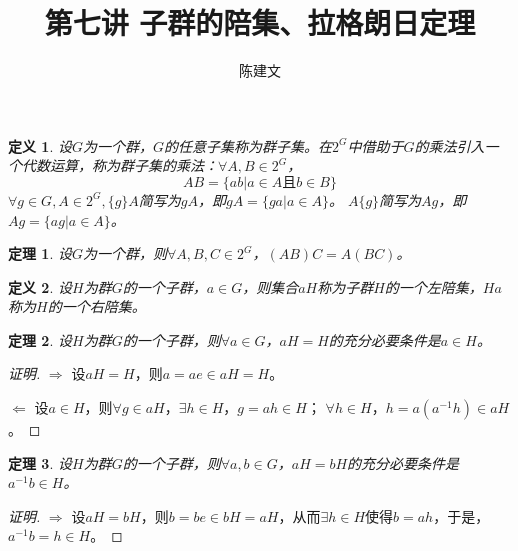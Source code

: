 \documentclass{article}
\newtheorem{Def}{定义}
\newtheorem{Thm}{定理}
\begin{document}
\begin{CJK*}{UTF8}{gbsn}
  \title{第七讲 子群的陪集、拉格朗日定理}
  \author{陈建文}
  \maketitle
  \begin{Def}
    设$G$为一个群，$G$的任意子集称为群子集。在$2^G$中借助于$G$的乘法引入一个代数运算，称为群子集的乘法：$\forall A,B\in 2^G$，
    \[AB=\{ab|a\in A \text{且} b\in B\}\]
    $\forall g\in G,A\in 2^G,\{g\}A$简写为$gA$，即$gA=\{ga|a\in A\}$。
    $A\{g\}$简写为$Ag$，即$Ag=\{ag|a\in A\}$。
  \end{Def}
  \begin{Thm}
    设$G$为一个群，则$\forall A,B,C\in 2^G$，$(AB)C=A(BC)$。
  \end{Thm}
\begin{Def}
  设$H$为群$G$的一个子群，$a\in G$，则集合$aH$称为子群$H$的一个左陪集，$Ha$称为$H$的一个右陪集。
\end{Def}

\begin{Thm}
  设$H$为群$G$的一个子群，则$\forall a\in G$，$aH=H$的充分必要条件是$a\in H$。
\end{Thm}
\begin{proof}[证明]
$\Rightarrow$
设$aH=H$，则$a=ae\in aH=H$。

$\Leftarrow$
设$a\in H$，则$\forall g\in aH$，$\exists h\in H$，$g=ah\in H$；
$\forall h\in H$，$h=a(a^{-1}h)\in aH$。
\end{proof}
\begin{Thm}
  设$H$为群$G$的一个子群，则$\forall a,b\in G$，$aH=bH$的充分必要条件是$a^{-1}b\in H$。
\end{Thm}
\begin{proof}[证明]
  $\Rightarrow$
  设$aH=bH$，则$b=be\in bH=aH$，从而$\exists h\in H$使得$b=ah$，于是，$a^{-1}b=h\in H$。


\end{proof}
\end{CJK*}
\end{document}

